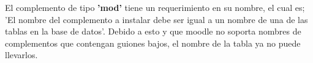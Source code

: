 El complemento de tipo  \textbf{'mod'} tiene un requerimiento en su nombre, el cual es; 'El nombre del complemento a instalar debe ser igual a un nombre
de una de las tablas en la base de datos'. Debido a esto y que moodle no soporta nombres de complementos que contengan guiones bajos, el
nombre de la tabla ya no puede llevarlos.\\
